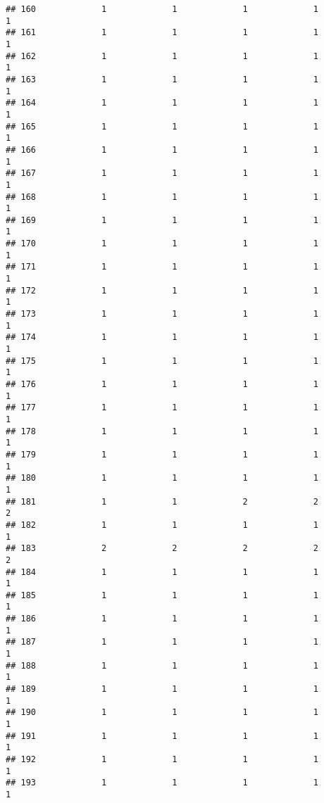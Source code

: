 \documentclass[
]{article}
\begin{document}
\begin{verbatim}
## 160             1             1             1             1             1
## 161             1             1             1             1             1
## 162             1             1             1             1             1
## 163             1             1             1             1             1
## 164             1             1             1             1             1
## 165             1             1             1             1             1
## 166             1             1             1             1             1
## 167             1             1             1             1             1
## 168             1             1             1             1             1
## 169             1             1             1             1             1
## 170             1             1             1             1             1
## 171             1             1             1             1             1
## 172             1             1             1             1             1
## 173             1             1             1             1             1
## 174             1             1             1             1             1
## 175             1             1             1             1             1
## 176             1             1             1             1             1
## 177             1             1             1             1             1
## 178             1             1             1             1             1
## 179             1             1             1             1             1
## 180             1             1             1             1             1
## 181             1             1             2             2             2
## 182             1             1             1             1             1
## 183             2             2             2             2             2
## 184             1             1             1             1             1
## 185             1             1             1             1             1
## 186             1             1             1             1             1
## 187             1             1             1             1             1
## 188             1             1             1             1             1
## 189             1             1             1             1             1
## 190             1             1             1             1             1
## 191             1             1             1             1             1
## 192             1             1             1             1             1
## 193             1             1             1             1             1

\end{verbatim}
\end{document}

